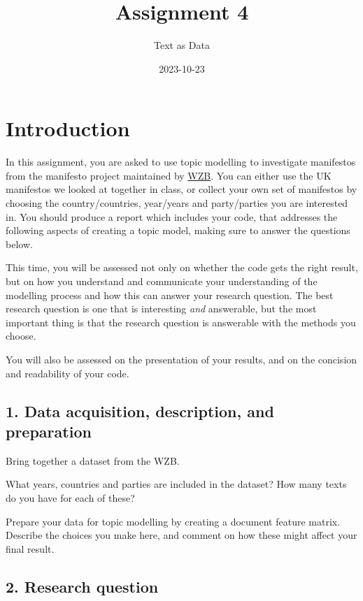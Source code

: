 \documentclass[
]{article}
\title{Assignment 4}
\author{Text as Data}
\date{2023-10-23}
\begin{document}
\maketitle

\hypertarget{introduction}{%
\section{Introduction}\label{introduction}}

In this assignment, you are asked to use topic modelling to investigate
manifestos from the manifesto project maintained by
\href{https://manifesto-project.wzb.eu/}{WZB}. You can either use the UK
manifestos we looked at together in class, or collect your own set of
manifestos by choosing the country/countries, year/years and
party/parties you are interested in. You should produce a report which
includes your code, that addresses the following aspects of creating a
topic model, making sure to answer the questions below.

This time, you will be assessed not only on whether the code gets the
right result, but on how you understand and communicate your
understanding of the modelling process and how this can answer your
research question. The best research question is one that is interesting
\emph{and} answerable, but the most important thing is that the research
question is answerable with the methods you choose.

You will also be assessed on the presentation of your results, and on
the concision and readability of your code.

\hypertarget{data-acquisition-description-and-preparation}{%
\subsection{1. Data acquisition, description, and
preparation}\label{data-acquisition-description-and-preparation}}

Bring together a dataset from the WZB.

What years, countries and parties are included in the dataset? How many
texts do you have for each of these?

Prepare your data for topic modelling by creating a document feature
matrix. Describe the choices you make here, and comment on how these
might affect your final result.

\hypertarget{research-question}{%
\subsection{2. Research question}\label{research-question}}
\end{document}
